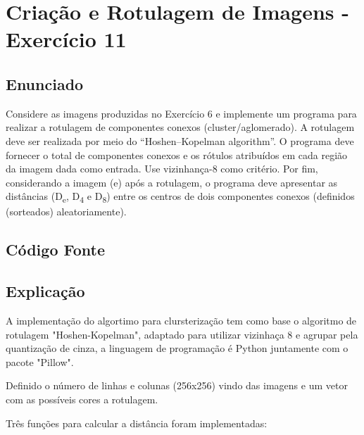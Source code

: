 \documentclass[10pt,a4paper]{article}
\begin{document}
\pagebreak

\section{Criação e Rotulagem de Imagens - Exercício 11}

\subsection{Enunciado}

\begin{flushleft}
Considere as imagens produzidas no Exercício 6 e implemente um programa para realizar a rotulagem de componentes conexos (cluster/aglomerado). A rotulagem deve ser realizada por meio do “Hoshen–Kopelman algorithm”. O programa deve fornecer o total de componentes conexos e os rótulos atribuídos em cada região da imagem dada como entrada. Use vizinhança-8 como critério. Por fim, considerando a imagem (e) após a rotulagem, o programa deve apresentar as distâncias (D\textsubscript{e}, D\textsubscript{4} e D\textsubscript{8}) entre os centros de dois componentes conexos (definidos (sorteados) aleatoriamente).
\end{flushleft}

\subsection{Código Fonte}



\subsection{Explicação}

\begin{flushleft}
A implementação do algortimo para clursterização tem como base o algoritmo de rotulagem "Hoshen-Kopelman", adaptado para utilizar vizinhaça 8 e agrupar pela quantização de cinza, a linguagem de programação é Python juntamente com o pacote "Pillow".
\end{flushleft}

\begin{flushleft}
Definido o número de linhas e colunas (256x256) vindo das imagens e um vetor com as possíveis cores a rotulagem.
\end{flushleft}

\begin{flushleft}
Três funções para calcular a distância foram implementadas:
\end{flushleft}
\end{document}
